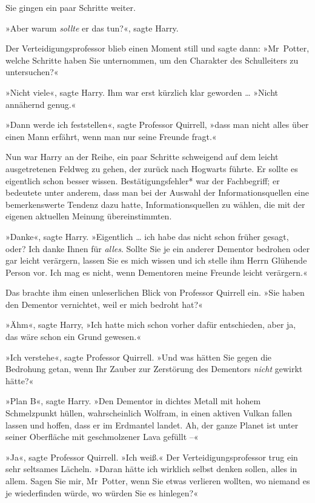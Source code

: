 {Sie gingen ein paar Schritte weiter.

»Aber warum \emph{sollte} er das tun?«, sagte Harry.

Der Verteidigungsprofessor blieb einen Moment still und sagte dann: »Mr~Potter, welche Schritte haben Sie unternommen, um den Charakter des Schulleiters zu untersuchen?«

»Nicht viele«, sagte Harry. Ihm war erst kürzlich klar geworden … »Nicht annähernd genug.«

»Dann werde ich feststellen«, sagte Professor Quirrell, »dass man nicht alles über einen Mann erfährt, wenn man nur seine Freunde fragt.«

Nun war Harry an der Reihe, ein paar Schritte schweigend auf dem leicht ausgetretenen Feldweg zu gehen, der zurück nach Hogwarts führte. Er sollte es eigentlich schon besser wissen. Bestätigungsfehler* war der Fachbegriff; er bedeutete unter anderem, dass man bei der Auswahl der Informationsquellen eine bemerkenswerte Tendenz dazu hatte, Informationsquellen zu wählen, die mit der eigenen aktuellen Meinung übereinstimmten.

»Danke«, sagte Harry. »Eigentlich … ich habe das nicht schon früher gesagt, oder? Ich danke Ihnen für \emph{alles}. Sollte Sie je ein anderer Dementor bedrohen oder gar leicht verärgern, lassen Sie es mich wissen und ich stelle ihm Herrn Glühende Person vor. Ich mag es nicht, wenn Dementoren meine Freunde leicht verärgern.«

Das brachte ihm einen unleserlichen Blick von Professor Quirrell ein. »Sie haben den Dementor vernichtet, weil er mich bedroht hat?«

»Ähm«, sagte Harry, »Ich hatte mich schon vorher dafür entschieden, aber ja, das wäre schon ein Grund gewesen.«

»Ich verstehe«, sagte Professor Quirrell. »Und was hätten Sie gegen die Bedrohung getan, wenn Ihr Zauber zur Zerstörung des Dementors \emph{nicht} gewirkt hätte?«

»Plan B«, sagte Harry. »Den Dementor in dichtes Metall mit hohem Schmelzpunkt hüllen, wahrscheinlich Wolfram, in einen aktiven Vulkan fallen lassen und hoffen, dass er im Erdmantel landet. Ah, der ganze Planet ist unter seiner Oberfläche mit geschmolzener Lava gefüllt --«

»Ja«, sagte Professor Quirrell. »Ich weiß.« Der Verteidigungsprofessor trug ein sehr seltsames Lächeln. »Daran hätte ich wirklich selbst denken sollen, alles in allem. Sagen Sie mir, Mr~Potter, wenn Sie etwas verlieren wollten, wo niemand es je wiederfinden würde, wo würden Sie es hinlegen?«

}
